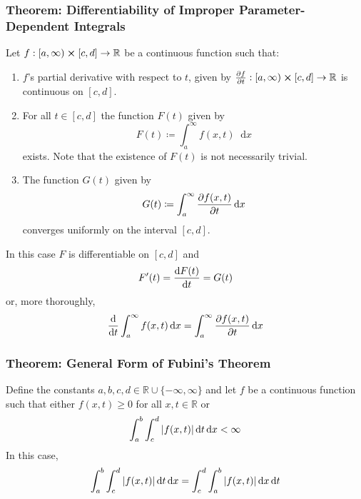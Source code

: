 \documentclass[11pt, a4paper]{article}
\newcommand{\diff}{\mathop{}\!\mathrm{d}} %
\begin{document}
\subsubsection{Theorem: Differentiability of Improper Parameter-Dependent Integrals}
Let $ f: [a, \infty) \cross [c, d] \rightarrow \mathbb{R}$ be a continuous function such that:
\begin{enumerate}
	\item $ f $'s partial derivative with respect to $ t $, given by  $ \pdv{f}{t} : [a, \infty) \cross [c, d] \rightarrow \mathbb{R} $ is continuous on $ [c, d] $.
	
	\item For all $ t \in [c, d] $ the function $ F(t) $ given by
	\begin{equation*}
	F(t) \coloneqq \int_{a}^{\infty} f(x, t) \diff x
	\end{equation*}
	exists. Note that the existence of $ F(t) $ is not necessarily trivial.
	
	\item The function $ G(t) $ given by
	\begin{equation*}
	G(t) \coloneqq \int_{a}^{\infty} \pdv{f(x, t)}{t} \diff x
	\end{equation*}
	converges uniformly on the interval $ [c, d] $.
\end{enumerate}
In this case $ F $ is differentiable on $ [c, d] $ and 
\begin{equation*}
F'(t) = \dv{F(t)}{t} = G(t)
\end{equation*}
or, more thoroughly,
\begin{equation*}
\dv{}{t} \int_{a}^{\infty} f(x, t) \diff x = \int_{a}^{\infty}  \pdv{f(x, t)}{t} \diff x
\end{equation*}

\subsubsection{Theorem: General Form of Fubini's Theorem}
Define the constants $ a, b, c, d \in \mathbb{R} \cup \{-\infty, \infty\} $ and let $ f $ be a continuous function such that either
$f(x, t) \geq 0 $ for all $ x, t \in \mathbb{R} $ or
\begin{equation*}
	\int_{a}^{b}\int_{c}^{d}\abs{f(x, t)}\diff t \diff x < \infty
\end{equation*}
In this case, 
\begin{equation*}
	\int_{a}^{b}\int_{c}^{d}\abs{f(x, t)}\diff t 	\diff x = 	\int_{c}^{d}\int_{a}^{b}\abs{f(x, t)}\diff x 	\diff t
\end{equation*}
\end{document}

